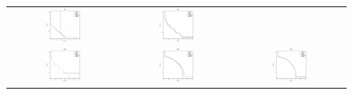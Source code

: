 \begin{figure}[H]
\begin{tabular}{ccc}
  \includegraphics[width=0.33\textwidth]{Figures_Chapter7/Results_Chapter3/UF7.eps} &
  \includegraphics[width=0.33\textwidth]{Figures_Chapter7/Results_Chapter3/WFG1.eps} \\
  \includegraphics[width=0.33\textwidth]{Figures_Chapter7/Results_Chapter3/WFG2.eps} &
  \includegraphics[width=0.33\textwidth]{Figures_Chapter7/Results_Chapter3/WFG8.eps} &
  \includegraphics[width=0.33\textwidth]{Figures_Chapter7/Results_Chapter3/WFG9.eps}
\end{tabular}
\end{figure}
%


